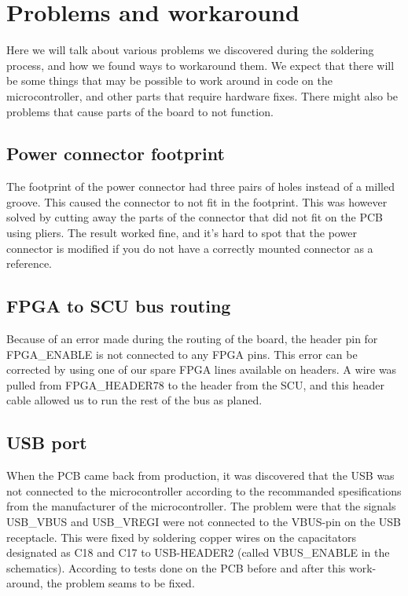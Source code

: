 \section {Problems and workaround}
Here we will talk about various problems we discovered during the soldering process, and how we found ways to workaround them.
We expect that there will be some things that may be possible to work around in code on the microcontroller, and other parts that require hardware fixes.
There might also be problems that cause parts of the board to not function.

\subsection{ Power connector footprint }

The footprint of the power connector had three pairs of holes instead of a milled groove.
This caused the connector to not fit in the footprint.
This was however solved by cutting away the parts of the connector that did not fit on the PCB using pliers.
The result worked fine, and it's hard to spot that the power connector is modified if you do not have a correctly mounted connector as a reference.

\subsection{ FPGA to SCU bus routing }

Because of an error made during the routing of the board, the header pin for FPGA\_ENABLE is not connected to any FPGA pins.
This error can be corrected by using one of our spare FPGA lines available on headers.
A wire was pulled from FPGA\_HEADER78 to the header from the SCU, and this header cable allowed us to run the rest of the bus as planed.

\subsection{ USB port }
When the PCB came back from production, it was discovered that the USB was not connected to the microcontroller
according to the recommanded spesifications from the manufacturer of the microcontroller. 
The problem were that the signals USB\_VBUS and USB\_VREGI were not connected to the VBUS-pin on the USB receptacle. This were fixed by soldering copper wires on the capacitators designated as C18 and C17 to USB-HEADER2 (called VBUS\_ENABLE in the schematics).
According to tests done on the PCB before and after this work-around, the problem seams to be fixed.


